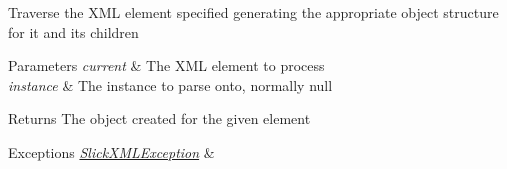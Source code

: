 Traverse the X\+ML element specified generating the appropriate object structure for it and it\textquotesingle{}s children


\begin{DoxyParams}{Parameters}
{\em current} & The X\+ML element to process \\
\hline
{\em instance} & The instance to parse onto, normally null \\
\hline
\end{DoxyParams}
\begin{DoxyReturn}{Returns}
The object created for the given element 
\end{DoxyReturn}

\begin{DoxyExceptions}{Exceptions}
{\em \mbox{\hyperlink{classorg_1_1newdawn_1_1slick_1_1util_1_1xml_1_1_slick_x_m_l_exception}{Slick\+X\+M\+L\+Exception}}} & \\
\hline
\end{DoxyExceptions}

